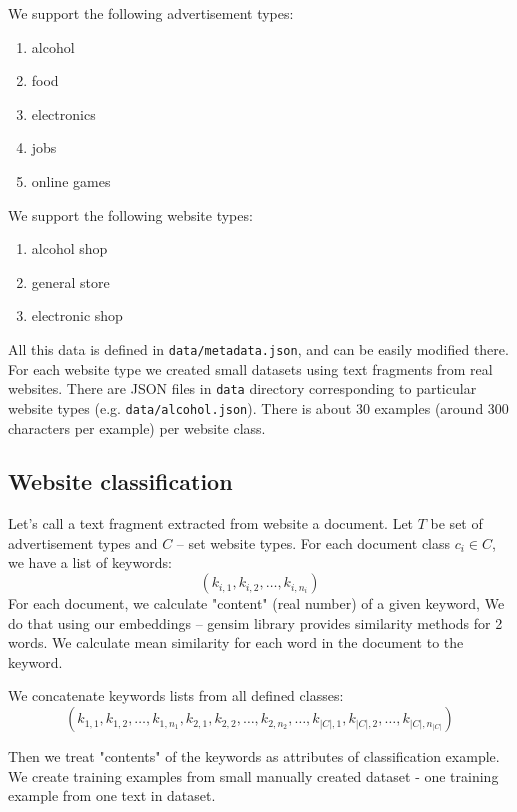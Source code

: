 \documentclass[a4paper]{article}
\begin{document}
We support the following advertisement types:
\begin{enumerate}
    \item alcohol
    \item food
    \item electronics
    \item jobs
    \item online games
\end{enumerate}

We support the following website types:
\begin{enumerate}
    \item alcohol shop
    \item general store
    \item electronic shop
\end{enumerate}

All this data is defined in \texttt{data/metadata.json}, and can be easily modified there.
For each website type we created small datasets using text fragments from real websites.
There are JSON files in \texttt{data} directory corresponding to particular website types
(e.g. \texttt{data/alcohol.json}).
There is about 30 examples (around 300 characters per example) per website class.


\subsection{Website classification}

Let's call a text fragment extracted from website a document.
Let $T$ be set of advertisement types and $C$ -- set website types.
For each document class $c_i\in{C}$, we have a list of keywords:
\begin{equation}
    (k_{i,1}, k_{i,2}, \ldots, k_{i, n_i})
\end{equation}
For each document, we calculate "content" (real number) of a given keyword,
We do that using our embeddings -- gensim library provides similarity methods for 2 words.
We calculate mean similarity for each word in the document to the keyword.

We concatenate keywords lists from all defined classes:
\begin{equation}
    (k_{1,1}, k_{1,2}, \ldots, k_{1, n_1},
    k_{2,1}, k_{2,2}, \ldots, k_{2, n_2},
    \ldots,
    k_{|C|,1}, k_{|C|,2}, \ldots, k_{|C|, n_{|C|}})
\end{equation}

Then we treat "contents" of the keywords as attributes of classification example.
We create training examples from small manually created dataset - one training example from one text in dataset.
\end{document}
